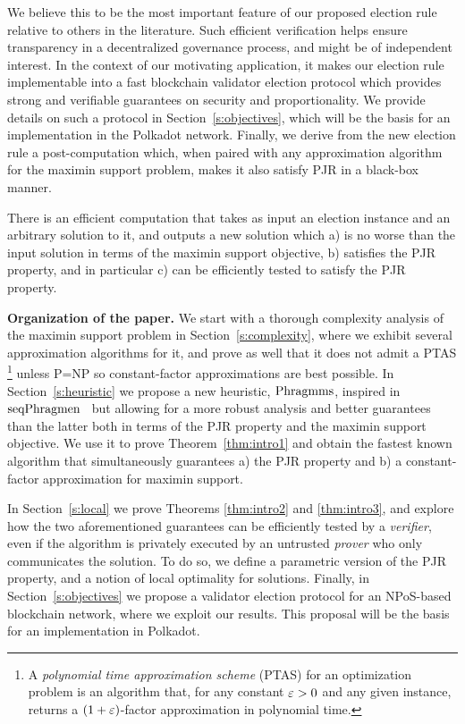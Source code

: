  We believe this to be the most important feature of our proposed election rule relative to others in the literature. 
Such efficient verification helps ensure transparency in a decentralized governance process, and might be of independent interest.  
In the context of our motivating application, it makes our election rule implementable into a fast blockchain validator election protocol which provides strong and verifiable guarantees on security and proportionality. 
We provide details on such a protocol in Section~\ref{s:objectives}, which will be the basis for an implementation in the Polkadot network.
%
Finally, we derive from the new election rule a post-computation which, when paired with any approximation algorithm for the maximin support problem, makes it also satisfy PJR in a black-box manner.

\begin{theorem}\label{thm:intro3}
There is an efficient computation that takes as input an election instance and an arbitrary solution to it, and outputs a new solution which a) is no worse than the input solution in terms of the maximin support objective, b) satisfies the PJR property, and in particular c) can be efficiently tested to satisfy the PJR property.
\end{theorem}

\textbf{Organization of the paper.}
We start with a thorough complexity analysis of the maximin support problem in Section~\ref{s:complexity}, 
where we exhibit several approximation algorithms for it, and prove as well that it does not admit a PTAS%
    \footnote{A \emph{polynomial time approximation scheme} (PTAS) for an optimization problem is an algorithm that, for any constant $\varepsilon>0$ and any given instance, returns a $(1+\varepsilon)$-factor approximation in polynomial time.} %
unless P=NP so constant-factor approximations are best possible.
%
In Section~\ref{s:heuristic} we propose a new heuristic, $\operatorname{Phragmms}$, inspired in $\operatorname{seqPhragmen}$~\cite{brill2017phragmen} but allowing for a more robust analysis and better guarantees than the latter both in terms of the PJR property and the maximin support objective. We use it to prove Theorem~\ref{thm:intro1} and obtain the fastest known algorithm that simultaneously guarantees a) the PJR property and b) a constant-factor approximation for maximin support.

In Section~\ref{s:local} we prove Theorems \ref{thm:intro2} and \ref{thm:intro3}, and explore how the two aforementioned guarantees can be efficiently tested by a \emph{verifier}, even if the algorithm is privately executed by an untrusted \emph{prover} who only communicates the solution. 
To do so, we define a parametric version of the PJR property, and a notion of local optimality for solutions. 
%
Finally, in Section~\ref{s:objectives} we propose a validator election protocol for an NPoS-based blockchain network, where we exploit our results. This proposal will be the basis for an implementation in Polkadot. 
